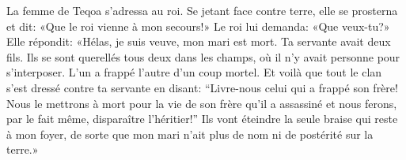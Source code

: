 La femme de Teqoa s’adressa au roi.
Se jetant face contre terre, elle se prosterna et dit:
	«Que le roi vienne à mon secours!»
Le roi lui demanda:
	«Que veux-tu?»
Elle répondit: «Hélas, je suis veuve, mon mari est mort.
Ta servante avait deux fils.
	Ils se sont querellés tous deux dans les champs,
	où il n’y avait personne pour s’interposer.
	L’un a frappé l’autre d’un coup mortel.
Et voilà que tout le clan s’est dressé contre ta servante en disant:
	“Livre-nous celui qui a frappé son frère!
	Nous le mettrons à mort pour la vie de son frère qu’il a assassiné
	et nous ferons, par le fait même, disparaître l’héritier!”
Ils vont éteindre la seule braise qui reste à mon foyer,
	de sorte que mon mari n’ait plus de nom ni de postérité sur la terre.»
